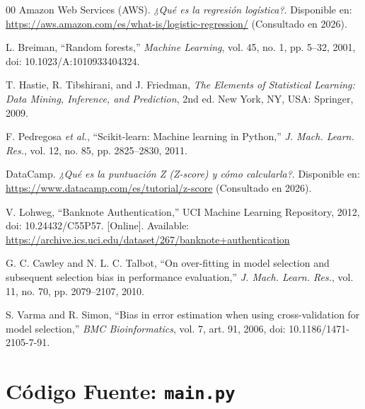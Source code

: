 \documentclass[conference]{IEEEtran}
\begin{document}
	\begin{thebibliography}{00}
    	Amazon Web Services (AWS). 
    	\textit{¿Qué es la regresión logística?}. 
    	Disponible en: \url{https://aws.amazon.com/es/what-is/logistic-regression/} (Consultado en 2026).
    	
    	L. Breiman, ``Random forests,'' \textit{Machine Learning}, vol. 45, no. 1, pp. 5--32, 2001, doi: 10.1023/A:1010933404324.
    	
    	T. Hastie, R. Tibshirani, and J. Friedman, \textit{The Elements of Statistical Learning: Data Mining, Inference, and Prediction}, 2nd ed. New York, NY, USA: Springer, 2009.
    	
    	F. Pedregosa \textit{et al.}, ``Scikit-learn: Machine learning in Python,'' \textit{J. Mach. Learn. Res.}, vol. 12, no. 85, pp. 2825--2830, 2011.
    	
    	DataCamp. 
    	\textit{¿Qué es la puntuación Z (Z-score) y cómo calcularla?}. 
    	Disponible en: \url{https://www.datacamp.com/es/tutorial/z-score} (Consultado en 2026).
    	
    	V. Lohweg, ``Banknote Authentication,'' UCI Machine Learning Repository, 2012, doi: 10.24432/C55P57. [Online]. Available: \url{https://archive.ics.uci.edu/dataset/267/banknote+authentication}
    	
    	G. C. Cawley and N. L. C. Talbot, ``On over-fitting in model selection and subsequent selection bias in performance evaluation,'' \textit{J. Mach. Learn. Res.}, vol. 11, no. 70, pp. 2079--2107, 2010.
    	
    	S. Varma and R. Simon, ``Bias in error estimation when using cross-validation for model selection,'' \textit{BMC Bioinformatics}, vol. 7, art. 91, 2006, doi: 10.1186/1471-2105-7-91.
    \end{thebibliography}
	
	\clearpage
	\onecolumn
	\appendices
	\section{Código Fuente: \texttt{main.py}}
	\label{app:codigo}
	
	
\end{document}
